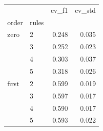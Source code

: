 \begin{tabular}{llrr}
\toprule
      &   &  cv\_f1 &  cv\_std \\
order & rules &        &         \\
\midrule
zero & 2 &  0.248 &   0.035 \\
      & 3 &  0.252 &   0.023 \\
      & 4 &  0.303 &   0.037 \\
      & 5 &  0.318 &   0.026 \\
first & 2 &  0.599 &   0.019 \\
      & 3 &  0.597 &   0.017 \\
      & 4 &  0.590 &   0.017 \\
      & 5 &  0.593 &   0.022 \\
\bottomrule
\end{tabular}
